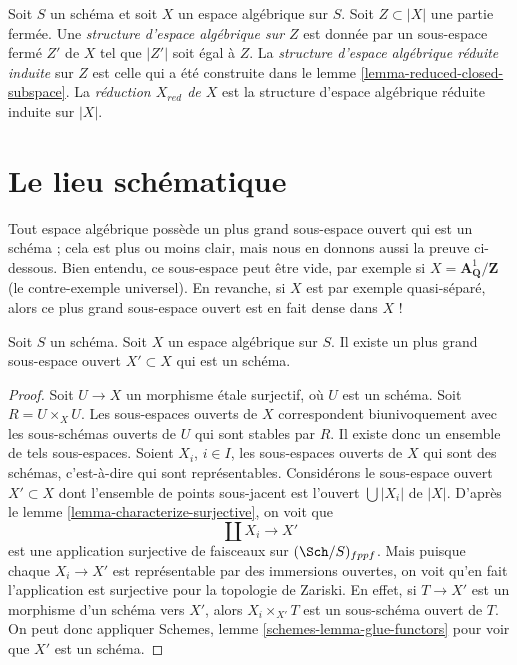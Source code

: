 \begin{definition}
\label{definition-reduced-induced-space}
Soit $S$ un schéma et soit $X$ un espace algébrique sur $S$.
Soit $Z \subset |X|$ une partie fermée.
Une {\it structure d'espace algébrique sur $Z$} est donnée par un sous-espace fermé
$Z'$ de $X$ tel que $|Z'|$ soit égal à $Z$.
La {\it structure d'espace algébrique réduite induite}
sur $Z$ est celle qui a été construite dans le
lemme \ref{lemma-reduced-closed-subspace}.
La {\it réduction $X_{red}$ de $X$} est la structure d'espace
algébrique réduite induite sur $|X|$.
\end{definition}











\section{Le lieu schématique}
\label{section-schematic}

\noindent
Tout espace algébrique possède un plus grand sous-espace ouvert qui est un
schéma ; cela est plus ou moins clair, mais nous en donnons aussi la preuve ci-dessous.
Bien entendu, ce sous-espace peut être vide, par exemple si
$X = \mathbf{A}^1_{\mathbf{Q}}/\mathbf{Z}$ (le
contre-exemple universel). En revanche, si $X$ est par exemple quasi-séparé,
alors ce plus grand sous-espace ouvert est en fait dense dans $X$ !

\begin{lemma}
\label{lemma-subscheme}
Soit $S$ un schéma.
Soit $X$ un espace algébrique sur $S$.
Il existe un plus grand sous-espace ouvert $X' \subset X$ qui est un schéma.
\end{lemma}

\begin{proof}
Soit $U \to X$ un morphisme \'etale surjectif, où $U$ est un schéma.
Soit $R = U \times_X U$. Les sous-espaces ouverts de $X$ correspondent biunivoquement
avec les sous-schémas ouverts de $U$ qui sont stables par $R$. Il existe donc un
ensemble de tels sous-espaces. Soient $X_i$, $i \in I$, les sous-espaces ouverts
de $X$ qui sont des schémas, c'est-à-dire qui sont représentables. Considérons le
sous-espace ouvert $X' \subset X$ dont l'ensemble de points sous-jacent est
l'ouvert $\bigcup |X_i|$ de $|X|$. D'après le
lemme \ref{lemma-characterize-surjective},
on voit que
$$
\coprod X_i \longrightarrow X'
$$
est une application surjective de faisceaux sur $(\Sch/S)_{fppf}$.
Mais puisque chaque $X_i \to X'$ est représentable par des immersions ouvertes,
on voit qu'en fait l'application est surjective pour la topologie de Zariski.
En effet, si $T \to X'$ est un morphisme d'un schéma
vers $X'$, alors $X_i \times_{X'} T$ est un sous-schéma ouvert de $T$.
On peut donc appliquer
Schemes, lemme \ref{schemes-lemma-glue-functors}
pour voir que $X'$ est un schéma.
\end{proof}


